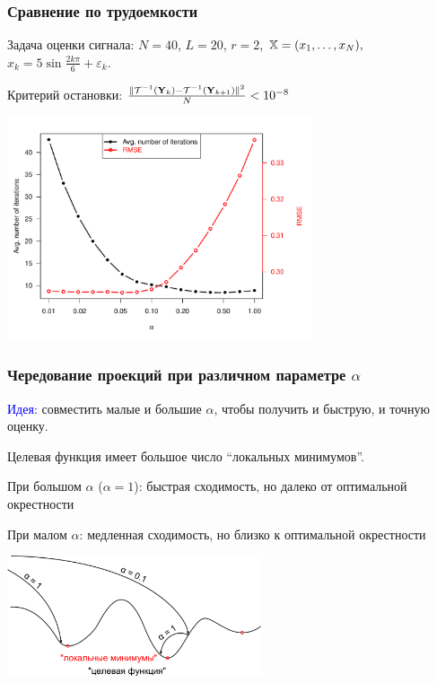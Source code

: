 \documentclass[unicode, notheorems]{beamer}
\begin{document}
\begin{frame}
	\frametitle{Сравнение по трудоемкости}
	Задача оценки сигнала: $N = 40$, $L = 20$, $r = 2$, $\mathbb{X} = (x_{1}, \ldots, x_N),$  $x_k = 5\sin{\frac{2 k \pi}{6}} + \varepsilon_k$.
	
	Критерий остановки: $\frac{\|\mathcal{T}^{-1}(\mathbf{Y}_k) - \mathcal{T}^{-1}(\mathbf{Y}_{k + 1})\|^2}{N} < 10^{-8}$
	\vspace{-0.4cm}
	\begin{center}
		\includegraphics*[width = 9cm]{2axis.pdf}
	\end{center}
\end{frame}

\begin{frame}
	\frametitle{Чередование проекций при различном параметре $\alpha$}
	\vspace{-0.2cm}
	\textcolor{blue}{Идея:} совместить малые и большие $\alpha$, чтобы получить и быструю, и точную оценку.
	
	Целевая функция имеет большое число ``локальных минимумов''.
	
	\vspace{0.2cm} При большом $\alpha$ ($\alpha = 1$): быстрая сходимость, но далеко от оптимальной окрестности
	
	\vspace{0.2cm} При малом $\alpha$: медленная сходимость, но близко к оптимальной окрестности
    \begin{center}
		\includegraphics*[width = 7.5cm]{optim.pdf} 
    \end{center}
\end{frame}
\end{document}
